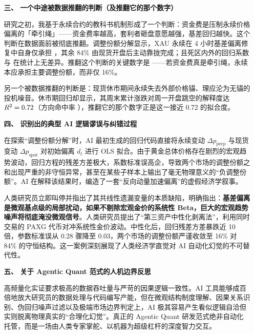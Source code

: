 \documentclass[UTF8,zihao=5,a4paper]{ctexart}
\newcommand{\key}[1]{\textbf{#1}}
\begin{document}
{\key{三、 一个中途被数据推翻的判断（及推翻它的那个数字）}

研究之初，我基于永续合约的教科书机制形成了一个判断：资金费是压制永续价格偏离的「牵引绳」——资金费率越高，套利者砸盘意愿越强，基差回归越快。这个判断在数据面前被彻底推翻。调整份额分解显示，XAU 永续在 4 小时基差偏离修复中自身仅承担 \dXAUshareall，其余 84\% 由现货开盘后主动靠拢完成；且死区内外的回归系数 \dXAUbetadead 与 \dXAUbetaout 在统计上无差异。推翻这个判断的关键数字是 \dXAUshareall——若资金费真是牵引绳，永续本应承担主要调整份额，而非仅 16\%。

另一个被数据推翻的判断是：现货休市期间永续失去外部价格锚、理应沦为无锚的投机噪音。休市期回归却显示，其周末累计涨跌对周一开盘跳空的解释度达 $R^2 = 0.72$（方向命中率 \clWkPosthit），推翻它的那个数字正是这一接近 0.72 的拟合度。

\key{四、 识别出的典型 AI 逻辑谬误与纠错过程}

在探索“调整份额分解”时，AI 最初生成的回归代码直接将永续变动 $\Delta p_{\text{perp}}$ 与现货变动 $\Delta p_{\text{spot}}$ 对初始偏离 $d_t$ 进行 OLS 拟合。由于黄金总体价格存在剧烈的宏观趋势波动，回归方程的残差方差极大，系数标准误高企，导致两个市场的调整份额之和出现严重的非守恒异常，甚至在某些子样本上输出了毫无物理意义的“负调整份额”。AI 在解释该结果时，编造了一套“反向动量加速偏离”的虚假经济学叙事。

人类研究员立即叫停并指出了其共线性遗漏变量的本质缺陷，明确指出：\textbf{基差偏离是微观基点级的局部扰动，如果不剔除宏观金价的系统性 Beta，巨大的宏观趋势噪声将彻底淹没微观信号}。人类研究员提出了“第三资产中性化剥离法”，利用同时交易的 PAXG 代币对冲系统性金价波动。中性化后，回归残差方差暴跌近 10 倍，参数标准误从 0.28 骤降至 0.03，两个市场的调整份额严谨收敛至 16\% 对 84\% 的守恒结构。这一案例深刻展现了人类经济学直觉对 AI 自动化幻觉的不可替代性。

\key{五、 关于 Agentic Quant 范式的人机边界反思}

高频量化实证要求极高的数据吞吐量与严苛的因果逻辑一致性。AI 工具能够成百倍地放大研究员的数据处理与代码编写产能，但在微观结构制度理解、因果关系识别、伪回归噪声过滤以及极端市场边界判定上，AI 极其容易产生看似逻辑自洽但实则脱离物理真实的“合理化幻觉”。真正的 Agentic Quant 研发范式绝非自动化托管，而是一场由人类专家掌舵、以机器为超级杠杆的深度智力交互。
}
\end{document}

